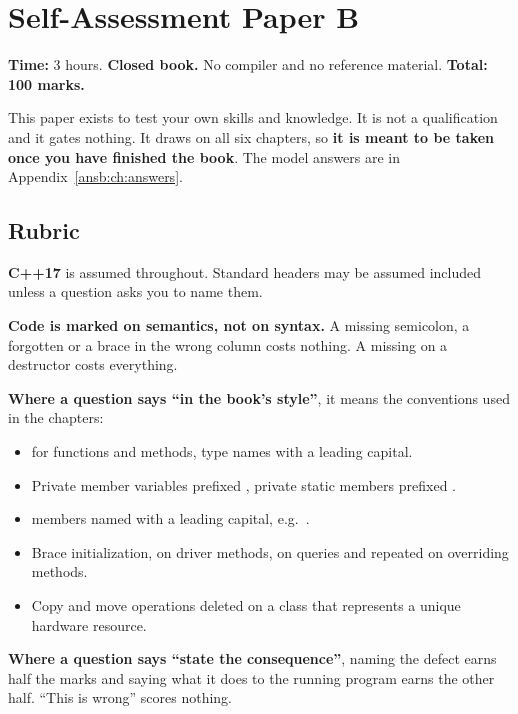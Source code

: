 
\chapter{Self-Assessment Paper B}
\label{exb:ch:paper}

\noindent\textbf{Time:} 3 hours. \textbf{Closed book.} No compiler and no reference material.
\textbf{Total: 100 marks.}

\medskip
This paper exists to test your own skills and knowledge. It is not a qualification and it gates
nothing. It draws on all six chapters, so \textbf{it is meant to be taken once you have finished the
book}. The model answers are in Appendix~\ref{ansb:ch:answers}.

\section*{Rubric}
\textbf{C++17} is assumed throughout. Standard headers may be assumed included unless a question
asks you to name them.

\textbf{Code is marked on semantics, not on syntax.} A missing semicolon, a forgotten
 or a brace in the wrong column costs nothing. A missing  on a
destructor costs everything.

\textbf{Where a question says ``in the book's style''}, it means the conventions used in the
chapters:
\begin{itemize}
  \item {} for functions and methods, type names with a leading capital.
  \item Private member variables prefixed , private static members prefixed .
  \item {} members named with a leading capital, e.g.\ .
  \item Brace initialization,  on driver methods, \code{[[nodiscard]]} on queries and
    repeated on overriding methods.
  \item Copy and move operations deleted on a class that represents a unique hardware resource.
\end{itemize}

\textbf{Where a question says ``state the consequence''}, naming the defect earns half the marks and
saying what it does to the running program earns the other half. ``This is wrong'' scores nothing.

